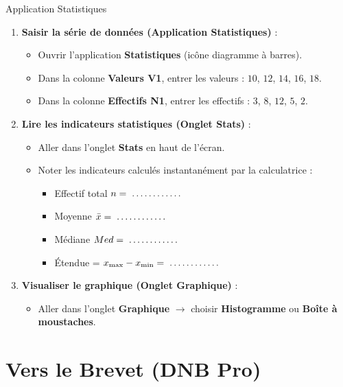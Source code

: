 \begin{tpinfo}{Application Statistiques}
\begin{enumerate}[leftmargin=1.5em, itemsep=2pt]
    \item \textbf{Saisir la série de données (Application Statistiques)} :
    \begin{itemize}
        \item Ouvrir l'application \textbf{Statistiques} (icône diagramme à barres).
        \item Dans la colonne \textbf{Valeurs V1}, entrer les valeurs : $10$, $12$, $14$, $16$, $18$.
        \item Dans la colonne \textbf{Effectifs N1}, entrer les effectifs : $3$, $8$, $12$, $5$, $2$.
    \end{itemize}
    \item \textbf{Lire les indicateurs statistiques (Onglet Stats)} :
    \begin{itemize}
        \item Aller dans l'onglet \textbf{Stats} en haut de l'écran.
        \item Noter les indicateurs calculés instantanément par la calculatrice :
        \begin{itemize}
            \item Effectif total $n = \pointille[2cm]$
            \item Moyenne $\bar{x} = \pointille[2cm]$
            \item Médiane $Med = \pointille[2cm]$
            \item Étendue = $x_{\text{max}} - x_{\text{min}} = \pointille[2cm]$
        \end{itemize}
    \end{itemize}
    \item \textbf{Visualiser le graphique (Onglet Graphique)} :
    \begin{itemize}
        \item Aller dans l'onglet \textbf{Graphique} $\rightarrow$ choisir \textbf{Histogramme} ou \textbf{Boîte à moustaches}.
    \end{itemize}
\end{enumerate}
\end{tpinfo}

\section{Vers le Brevet (DNB Pro)}

